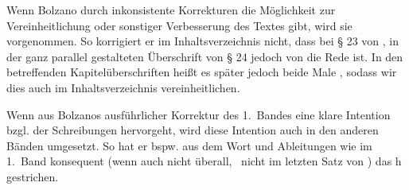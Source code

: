 Wenn Bolzano durch inkonsistente Korrekturen die Möglichkeit zur Vereinheitlichung oder sonstiger Verbesserung des Textes gibt, wird sie vorgenommen. So korrigiert er im Inhaltsverzeichnis nicht, dass bei § 23 von , in der ganz parallel gestalteten Überschrift von § 24 jedoch von  die Rede ist. In den betreffenden Kapitelüberschriften heißt es später jedoch beide Male , sodass wir dies auch im Inhaltsverzeichnis vereinheitlichen.\par
Wenn aus Bolzanos ausführlicher Korrektur des 1.~Bandes eine klare Intention bzgl. der Schreibungen hervorgeht, wird diese Intention auch in den anderen Bänden umgesetzt. So hat er bspw. aus dem Wort  und Ableitungen wie  im 1.~Band konsequent (wenn auch nicht überall, \zB\ nicht im letzten Satz von ) das h gestrichen. 


